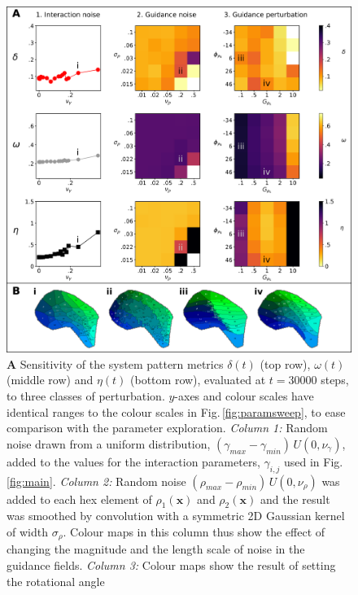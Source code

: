 \documentclass[9pt,lineno]{elife}
\newcommand{\sensitivity}[1]{\textcolor{revgblack}{#1}}
\newcommand{\mb}[1]{\mathbf{#1}}
\begin{document}
\begin{figure}
  \begin{fullwidth}
    \includegraphics[width=\linewidth]{./Fig3.png}
    \caption{
      \sensitivity{\textbf{A} Sensitivity of the system pattern
        metrics $\delta(t)$ (top row), $\omega(t)$ (middle row) and $\eta(t)$
        (bottom row), evaluated at $t=30000$ steps,
        to three classes of perturbation. $y$-axes and colour scales have identical ranges
        to the colour scales in Fig.\,\ref{fig:paramsweep}, to ease comparison
        with the parameter exploration.
        \emph{Column 1:} Random noise drawn from a uniform distribution,
        $(\gamma_{max}-\gamma_{min})\,U(0,\nu_\gamma)$, added
        to the values for the interaction parameters, $\gamma_{i,j}$ used in
        Fig.\,\ref{fig:main}.
        \emph{Column 2:} Random noise $(\rho_{max} - \rho_{min})\,U(0, \nu_{\rho})$
        was added to each hex element of $\rho_1(\mb{x})$ and $\rho_2(\mb{x})$ and the result
        was smoothed by convolution with a symmetric 2D
        Gaussian kernel of width $\sigma_\rho$. Colour maps in this column
        thus show the effect of changing the magnitude and the length scale of
        noise in the guidance fields.
        \emph{Column 3:} Colour maps show the result of setting the rotational angle
}}
\end{fullwidth}
\end{figure}
\end{document}
